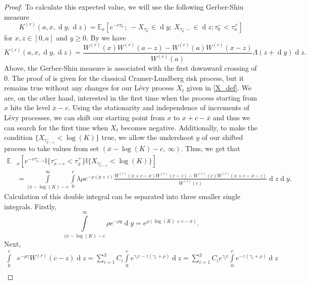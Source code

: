 \documentclass[10pt]{amsart}
\def\E{{\mathbb{E}}}
\def \R{{{\rm I{\!}\rm R}}}
\def \I{{\mathbb{I}}}
\newcommand{\dx}{\operatorname{d}\!}
\def\E{{\mathbb E}} \def\PP{\mc P} \def\Z{{\mathbb Z}} \def\R{{\mathbb R}}
\begin{document}
\begin{proof}
			To calculate this expected value, we will use the following Gerber-Shiu measure
			\begin{equation*}
				K^{(r)}(a,x,\dx y, \dx z) =	\E_x \left[ e^{-r\tau_0^-} ;\ -X_{\tau_0^-} \in \dx y;\ X_{\tau_0^- -} \in \dx z; \tau_0^- < \tau_a^+ \right]
			\end{equation*}
			for $x,z \in [0,a]$ and $y \geq 0$. By \cite[Thm. 5.5]{kyprianou} we have
			\begin{equation*}
				K^{(r)}(a,x,\dx y, \dx z) = \frac{W^{(r)}(x)W^{(r)}(a-z) - W^{(r)}(a)W^{(r)}(x-z)}{W^{(r)}(a)}\Lambda(z + \dx y)\dx z.
			\end{equation*}
			Above, the Gerber-Shiu measure is associated with the first downward crossing of $0$.
			The proof of \cite[Thm. 5.5]{kyprianou} is given for the classical Cramer-Lundberg risk process, but it remains true without any changes for our L\'evy process
			$X_t$ given in \eqref{X_def}.
			We are, on the other hand, interested in the first time when the process starting from $x$ hits the level $\overline{x}-c$. Using the stationarity and independence of increments of L\'evy processes, we can shift our starting point from $x$ to $x+c-\overline{x}$ and thus we can search for the first time when $X_t$ becomes negative. Additionally, to make the condition $\{ X_{\tau_{\overline{x}-c}^- } < \log(K)\}$ true, we allow the undershoot $y$ of our shifted process to take values from set $(\overline{x}-\log(K)-c,\ \infty)$. Thus, we get that
			\begin{align*}
				\E&_x \left[ e^{-r\tau_{\overline{x}-c}^- }
				\I \{ \tau_{\overline{x}-c}^- < \tau_{\overline{x}}^+ \}
				\I \{ X_{\tau_{\overline{x}-c}^- } < \log(K)\}
				\right] \\
				\nonumber&=\! \int\limits_{(\overline{x}-\log(K)-c}^{\infty} \int\limits_{0}^{c}  \lambda \rho e^{-\rho (y+z)} \frac{W^{(r)}(x+c-\overline{x})W^{(r)}(c-z) - W^{(r)}(c)W^{(r)}(x+c-\overline{x}-z)}{W^{(r)}(c)}\dx z \dx y.
			\end{align*}
			Calculation of this double integral can be separated into three smaller single integrals. Firstly,
			\begin{equation*}
				\int\limits_{(\overline{x}-\log(K)-c}^{\infty} \rho e^{-\rho y} \dx y = e^{\rho (\log(K)+c - \overline{x})}.
			\end{equation*}
			Next,
			\begin{align*}
				\int\limits_{0}^{c}& e^{-\rho z} W^{(r)}(c-z) \dx z = \sum_{i=1}^3 C_i \int\limits_{0}^{c} e^{\gamma_i c - z(\gamma_i + \rho)} \dx z = \sum_{i=1}^3 C_i e^{\gamma_i c} \int\limits_{0}^{c} e^{ - z(\gamma_i + \rho)} \dx z \\

\end{align*}
\end{proof}
\end{document}
